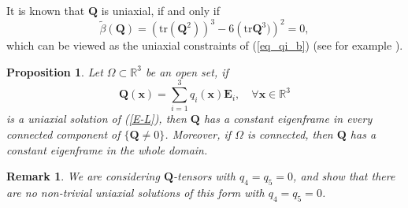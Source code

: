 \documentclass[10pt, a4paper]{article}
\newtheorem{proposition}{Proposition}[section]
\newtheorem*{rem}{Remark}
\newcommand\x{\mathbf{x}}
\newcommand\Qvec{\mathbf{Q}}
\newcommand\E{\mathbf{E}}
\newcommand\tr{\mathrm{tr}}
\begin{document}
It is known that $\Qvec$ is uniaxial, if and only if
\begin{equation}\label{tr_uni}
\tilde{\beta}(\Qvec) = \left( \tr (\Qvec^2) \right)^3 - 6 \left( \tr \Qvec^3) \right)^2 = 0,
\end{equation}
which can be viewed as the uniaxial constraints of (\ref{eq_qi_b}) (see for example \cite{amaz}).

\begin{proposition}
\label{prop:4.1} 
Let $\Omega \subset \mathbb{R}^3$ be an open set, if
\begin{equation}\label{Ansatz}
\Qvec(\x) = \sum_{i = 1}^{3} q_i(\x) \E_i, \quad \forall \x \in \mathbb{R}^3
\end{equation}
is a uniaxial solution of (\ref{E-L}), then
$\Qvec$ has %
a constant eigenframe in every connected component of $\{ \Qvec \neq 0 \}$. Moreover, if $\Omega$ is connected, then $\Qvec$ has a constant eigenframe in the whole domain. 
\end{proposition}

\begin{rem}
We are considering $\Qvec$-tensors with $q_4 =q_5 = 0$, and show that there are no non-trivial uniaxial solutions of this form with $q_4 = q_5 = 0$.
\end{rem}
\end{document}

